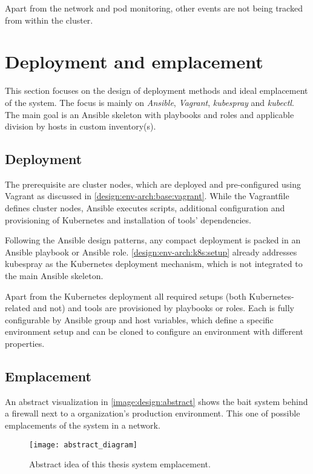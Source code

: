 Apart from the network and pod monitoring, other events are not being tracked from within the cluster.

\section{Deployment and emplacement \label{design:deployment}}
This section focuses on the design of deployment methods and ideal emplacement of the system. The focus is mainly on \textit{Ansible}, \textit{Vagrant}, \textit{kubespray} and \textit{kubectl}. The main goal is an Ansible skeleton with playbooks and roles and applicable division by hosts in custom inventory(s).

\subsection{Deployment \label{design:deployment:deploy}}
The prerequisite are cluster nodes, which are deployed and pre-configured using Vagrant as discussed in \autoref{design:env-arch:base:vagrant}. While the Vagrantfile defines cluster nodes, Ansible executes scripts, additional configuration and provisioning of Kubernetes and installation of tools' dependencies.

Following the Ansible design patterns, any compact deployment is packed in an Ansible playbook or Ansible role. \autoref{design:env-arch:k8s:setup} already addresses kubespray as the Kubernetes deployment mechanism, which is not integrated to the main Ansible skeleton.

Apart from the Kubernetes deployment all required setups (both Kubernetes-related and not) and tools are provisioned by playbooks or roles. Each is fully configurable by Ansible group and host variables, which define a specific environment setup and can be cloned to configure an environment with different properties.

\subsection{Emplacement \label{design:deployment:place}}
An abstract visualization in \autoref{image:design:abstract} shows the bait system behind a firewall next to a organization's production environment. This one of possible emplacements of the system in a network. 

\begin{figure}[h]
	\centering
	\texttt{[image: abstract\_diagram]}
	\caption{Abstract idea of this thesis system emplacement.}
	\label{image:design:abstract}
\end{figure}

